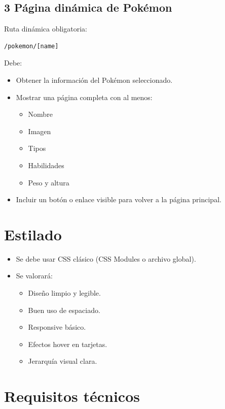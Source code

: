 \documentclass[12pt,a4paper]{article}
\begin{document}
\subsection*{3 Página dinámica de Pokémon}

Ruta dinámica obligatoria:

\begin{verbatim}
/pokemon/[name]
\end{verbatim}

Debe:

\begin{itemize}
    \item Obtener la información del Pokémon seleccionado.
    \item Mostrar una página completa con al menos:
    \begin{itemize}
        \item Nombre
        \item Imagen
        \item Tipos
        \item Habilidades
        \item Peso y altura
    \end{itemize}
    \item Incluir un botón o enlace visible para volver a la página principal.
\end{itemize}

\section*{Estilado}

\begin{itemize}
    \item Se debe usar CSS clásico (CSS Modules o archivo global).
    \item Se valorará:
    \begin{itemize}
        \item Diseño limpio y legible.
        \item Buen uso de espaciado.
        \item Responsive básico.
        \item Efectos hover en tarjetas.
        \item Jerarquía visual clara.
    \end{itemize}
\end{itemize}

\section*{Requisitos técnicos}
\end{document}
